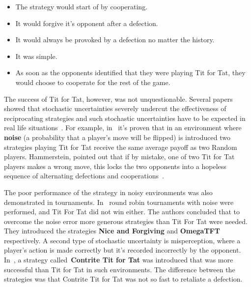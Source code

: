\documentclass{article}
\theoremstyle{definition}
\begin{document}
\begin{itemize}
    \item The strategy would start of by cooperating.
    \item It would forgive it's opponent after a defection.
    \item It would always be provoked by a defection no matter the history.
    \item It was simple.
    \item As soon as the opponents identified that they were playing Tit for Tat,
    they would choose to cooperate for the rest of the game.
\end{itemize}

The success of Tit for Tat, however, was not unquestionable. Several papers
showed that stochastic uncertainties severely undercut the effectiveness of
reciprocating strategies and such stochastic uncertainties have to be expected
in real life situations~\cite{Milinski1987}. For example, in~\cite{Molander1985}
it's 
proven that in an environment where \textbf{noise} (a probability that a
player's move will be flipped) is introduced two strategies playing Tit for Tat
receive the same average payoff as two Random players.
Hammerstein, pointed out that if by mistake, one of two
Tit for Tat players makes a wrong move, this locks the two opponents into a
hopeless sequence of alternating defections and cooperations~\cite{Hammerstein1984}.

The poor performance of the strategy in noisy environments was also demonstrated
in tournaments. In~\cite{Bendor1991, Donninger1986} round robin
tournaments with noise were performed, and Tit For Tat did not win either.
The authors concluded that to overcome the noise error more generous strategies
than Tit For Tat were needed. They introduced the strategies \textbf{Nice and Forgiving}
and \textbf{OmegaTFT} respectively. A second type of stochastic uncertainty is
misperception, where a player's action is made correctly but it's recorded
incorrectly by the opponent. In~\cite{Wu1995}, a strategy
called~\textbf{Contrite Tit for Tat} was introduced that was more successful than Tit for Tat
in such environments. The difference between the strategies was that Contrite
Tit for Tat was not so fast to retaliate a defection.
\end{document}
